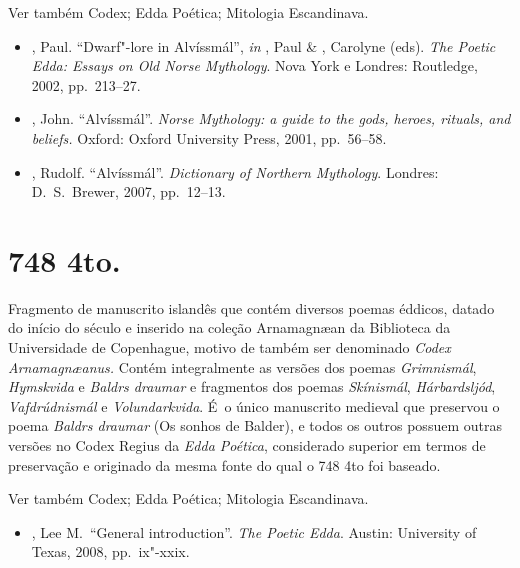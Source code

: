 Ver também Codex; Edda Poética; Mitologia Escandinava.



\begin{itemize}\footnotesize
\item
  , Paul. ``Dwarf"-lore in Alvíssmál'', \emph{in}  , Paul \& ,
  Carolyne (eds). \emph{The Poetic Edda: Essays on Old Norse
  Mythology}. Nova York e Londres: Routledge, 2002, pp.~213--27.
\item
  , John. ``Alvíssmál''. \emph{Norse Mythology: a guide to the gods,
  heroes, rituals, and beliefs.} Oxford: Oxford University Press, 2001,
  pp.~56--58.
\item
  , Rudolf. ``Alvíssmál''. \emph{Dictionary of Northern Mythology}.
  Londres: D.~S.~Brewer, 2007, pp.~12--13.
\end{itemize}

\section{ 748  4to.}

Fragmento de manuscrito islandês que contém diversos poemas éddicos,
datado do início do século  e inserido na coleção Arnamagnæan da
Biblioteca da Universidade de Copenhague, motivo de também ser
denominado \emph{Codex Arnamagnæanus.} Contém integralmente as versões
dos poemas \emph{Grimnismál}, \emph{Hymskvida} e \emph{Baldrs draumar} e
fragmentos dos poemas \emph{Skínismál}, \emph{Hárbardsljód},
\emph{Vafdrúdnismál} e \emph{Volundarkvida}. É~o único manuscrito
medieval que preservou o poema \emph{Baldrs draumar} (Os sonhos de
Balder), e todos os outros possuem outras versões no Codex Regius da
\emph{Edda Poética}, considerado superior em termos de preservação e
originado da mesma fonte do qual o  748  4to foi baseado.

Ver também Codex; Edda Poética; Mitologia Escandinava.



\begin{itemize}\footnotesize
\item
  , Lee M.~``General introduction''. \emph{The Poetic Edda}.
  Austin: University of Texas, 2008, pp.~ix"-xxix.
\end{itemize}

\section{ }

